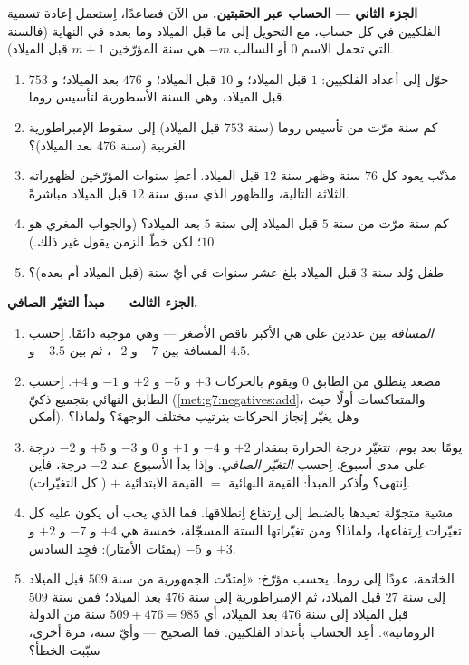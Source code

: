 \begin{problem}
\medskip
\noindent\textbf{الجزء الثاني --- الحساب عبر الحقبتين.}
من الآن فصاعدًا، اِستعمل إعادة تسمية الفلكيين في كل
حساب، مع التحويل إلى ما قبل الميلاد وما بعده في النهاية (فالسنة التي تحمل الاسم
$0$ أو السالب $-m$ هي سنة المؤرّخين $m + 1$ قبل الميلاد).
\begin{enumerate}[resume]
  \item حوّل إلى أعداد الفلكيين: $1$ قبل الميلاد؛ و $10$ قبل الميلاد؛ و
        $476$ بعد الميلاد؛ و $753$ قبل الميلاد، وهي السنة الأسطورية لتأسيس روما.
  \item كم سنة مرّت من تأسيس روما
        (سنة $753$ قبل الميلاد) إلى سقوط الإمبراطورية الغربية (سنة $476$ بعد الميلاد)؟
  \item مذنّب يعود كل $76$ سنة وظهر سنة
        $12$ قبل الميلاد. أعطِ سنوات المؤرّخين لظهوراته الثلاثة
        التالية، وللظهور الذي سبق سنة $12$ قبل الميلاد مباشرةً.
  \item كم سنة مرّت من سنة $5$ قبل الميلاد إلى سنة $5$ بعد الميلاد؟ (والجواب
        المغري هو $10$؛ لكن خطّ الزمن يقول غير ذلك.)
  \item طفل وُلد سنة $3$ قبل الميلاد بلغ عشر سنوات في أيّ
        سنة (قبل الميلاد أم بعده)؟
\end{enumerate}

\medskip
\noindent\textbf{الجزء الثالث --- مبدأ التغيّر الصافي.}
\begin{enumerate}[resume]
  \item \emph{المسافة} بين عددين على  هي
        الأكبر ناقص الأصغر --- وهي موجبة دائمًا.
        اِحسب المسافة بين $-7$ و $-2$، ثم بين
        $-3.5$ و $4.5$.
  \item مصعد ينطلق من الطابق $0$ ويقوم بالحركات $+3$
        و $-5$ و $+2$ و $-1$ و $+4$. اِحسب الطابق النهائي
        بتجميع ذكيّ (\cref{met:g7:negatives:add}،
        والمتعاكسات أولًا حيث أمكن). وهل يغيّر إنجاز
        الحركات بترتيب مختلف الوجهةَ؟ ولماذا؟
  \item يومًا بعد يوم، تتغيّر درجة الحرارة بمقدار $+2$ و $-4$ و $+1$
        و $0$ و $-3$ و $+5$ و $-2$ درجة على مدى أسبوع. اِحسب
        \emph{التغيّر الصافي}. وإذا بدأ الأسبوع عند $-2$ درجة،
        فأين اِنتهى؟ واُذكر المبدأ: القيمة النهائية $=$
        القيمة الابتدائية $+$ ( كل التغيّرات).
  \item مشية متجوّلة تعيدها بالضبط إلى اِرتفاع
        اِنطلاقها. فما الذي يجب أن يكون عليه  كل تغيّرات اِرتفاعها،
        ولماذا؟ ومن تغيّراتها الستة المسجّلة، خمسة هي
        $+4$ و $-7$ و $+2$ و $+3$ و $-5$ (بمئات الأمتار):
        فجِد السادس.
  \item الخاتمة، عودًا إلى روما. يحسب مؤرّخ: «اِمتدّت
        الجمهورية من سنة $509$ قبل الميلاد إلى سنة $27$ قبل الميلاد، ثم الإمبراطورية
        إلى سنة $476$ بعد الميلاد؛ فمن سنة $509$ قبل الميلاد إلى سنة $476$ بعد الميلاد، أي
        $509 + 476 = 985$ سنة من الدولة الرومانية». أعِد
        الحساب بأعداد الفلكيين. فما 
        الصحيح --- وأيّ سنة، مرة أخرى، سبّبت
        الخطأ؟
\end{enumerate}
\end{problem}
